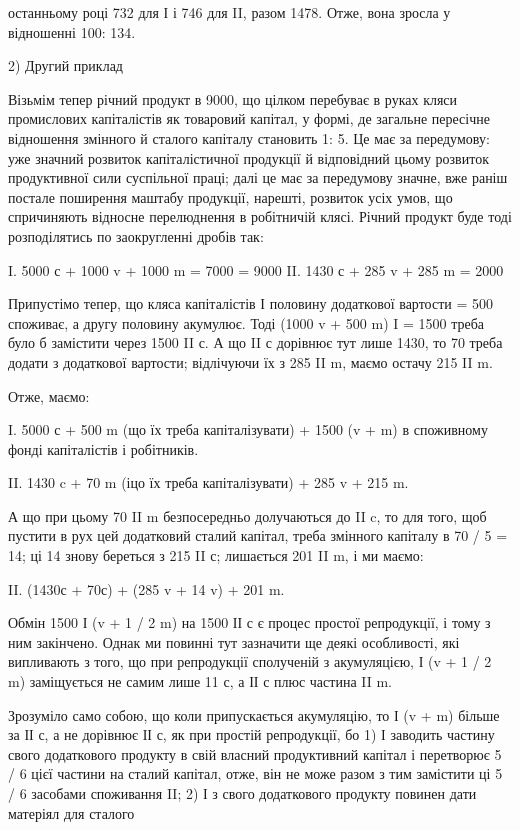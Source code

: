 \parcont{}  %
останньому році 732 для І і 746 для II, разом 1478. Отже, вона
зросла у відношенні 100: 134.

2) Другий приклад

Візьмім тепер річний продукт в 9000, що цілком перебуває в руках
кляси промислових капіталістів як товаровий капітал, у формі, де загальне
пересічне відношення змінного й сталого капіталу становить 1: 5.
Це має за передумову: уже значний розвиток капіталістичної продукції
й відповідний цьому розвиток продуктивної сили суспільної праці; далі
це має за передумову значне, вже раніш постале поширення маштабу
продукції, нарешті, розвиток усіх умов, що спричиняють відносне перелюднення
в робітничій клясі. Річний продукт буде тоді розподілятись по
заокругленні дробів так:

I.  5000 с + 1000 v + 1000 m = 7000  = 9000
II. 1430 с + 285 v + 285 m = 2000

Припустімо тепер, що кляса капіталістів І половину додаткової вартости
= 500 споживає, а другу половину акумулює. Тоді (1000 v +
500 m) I = 1500 треба було б замістити через 1500 II с. А що II с
дорівнює тут лише 1430, то 70 треба додати з додаткової вартости;
відлічуючи їх з 285 II m, маємо остачу 215 II m.

Отже, маємо:

I.  5000 с + 500 m (що їх треба капіталізувати) + 1500 (v + m) в споживному
фонді капіталістів і робітників.

II.  1430 c + 70 m (іцо їх треба капіталізувати) + 285 v + 215 m.

А що при цьому 70 II m безпосередньо долучаються до II c, то для
того, щоб пустити в рух цей додатковий сталий капітал, треба змінного
капіталу в 70 / 5 = 14; ці 14 знову береться з 215 II с; лишається 201 II m,
і ми маємо:

II. (1430с + 70с) + (285 v + 14 v) + 201 m.

Обмін 1500 І (v + 1 / 2 m) на 1500 ІІ с є процес простої репродукції,
і тому з ним закінчено. Однак ми повинні тут зазначити ще деякі особливості,
які випливають з того, що при репродукції сполученій з акумуляцією,
І (v + 1 / 2 m) заміщується не самим лише 11 с, а ІІ с плюс частина
II m.

Зрозуміло само собою, що коли припускається акумуляцію, то І (v + m)
більше за ІІ с, а не дорівнює ІІ с, як при простій репродукції, бо
1) І заводить частину свого додаткового продукту в свій власний
продуктивний капітал і перетворює 5 / 6 цієї частини на сталий капітал,
отже, він не може разом з тим замістити ці 5 / 6 засобами споживання II;
2) І з свого додаткового продукту повинен дати матеріял для сталого
\parbreak{}  %
